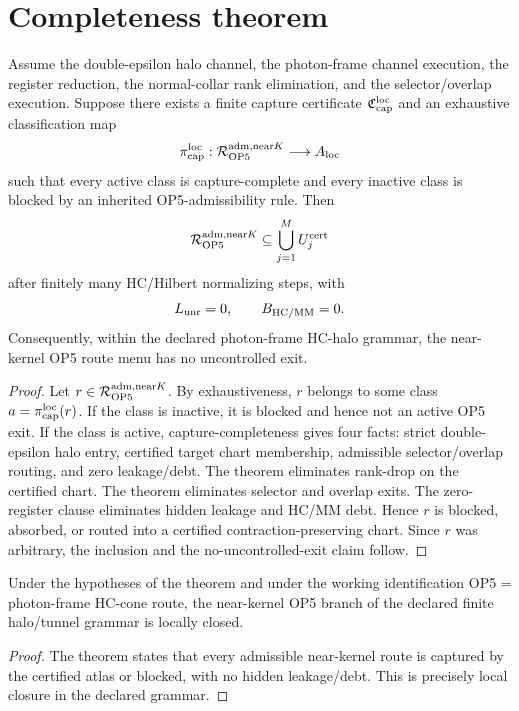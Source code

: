 \section{Completeness theorem}

\begin{theorem}
Assume the double-epsilon halo channel, the photon-frame channel execution, the register reduction, the normal-collar rank elimination, and the selector/overlap execution. Suppose there exists a finite capture certificate \(\mathfrak C_{\mathrm{cap}}^{\mathrm{loc}}\) and an exhaustive classification map
\[
\pi_{\mathrm{cap}}^{\mathrm{loc}}:\mathcal R_{\mathrm{OP} 5}^{\mathrm{adm},\mathrm{near} K}\longrightarrow A_{\mathrm{loc}}
\]
such that every active class is capture-complete and every inactive class is blocked by an inherited OP5-admissibility rule. Then
\[
\mathcal R_{\mathrm{OP} 5}^{\mathrm{adm},\mathrm{near} K}
\subseteq
\bigcup_{j=1}^{M}U_j^{\mathrm{cert}}
\]
after finitely many HC/Hilbert normalizing steps, with
\[
L_{\mathrm{unr}}=0,
\qquad
B_{\mathrm{HC}/\mathrm{MM}}=0.
\]
Consequently, within the declared photon-frame HC-halo grammar, the near-kernel OP5 route menu has no uncontrolled exit.
\end{theorem}

\begin{proof}
Let \(r\in\mathcal R_{\mathrm{OP} 5}^{\mathrm{adm},\mathrm{near} K}\). By exhaustiveness, \(r\) belongs to some class \(a=\pi_{\mathrm{cap}}^{\mathrm{loc}}(r)\). If the class is inactive, it is blocked and hence not an active OP5 exit. If the class is active, capture-completeness gives four facts: strict double-epsilon halo entry, certified target chart membership, admissible selector/overlap routing, and zero leakage/debt. The theorem eliminates rank-drop on the certified chart. The theorem eliminates selector and overlap exits. The zero-register clause eliminates hidden leakage and HC/MM debt. Hence \(r\) is blocked, absorbed, or routed into a certified contraction-preserving chart. Since \(r\) was arbitrary, the inclusion and the no-uncontrolled-exit claim follow.
\end{proof}

\begin{corollary}
Under the hypotheses of the theorem and under the working identification OP5 = photon-frame HC-cone route, the near-kernel OP5 branch of the declared finite halo/tunnel grammar is locally closed.
\end{corollary}

\begin{proof}
The theorem states that every admissible near-kernel route is captured by the certified atlas or blocked, with no hidden leakage/debt. This is precisely local closure in the declared grammar.
\end{proof}

